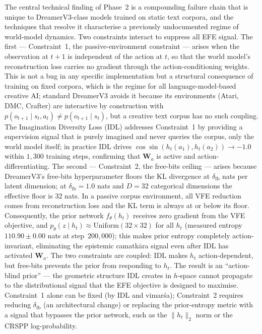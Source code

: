\documentclass[journal,onecolumn,11pt]{IEEEtran}
\begin{document}
The central technical finding of Phase~2 is a compounding failure chain that
is unique to DreamerV3-class models trained on static text corpora, and the
techniques that resolve it characterise a previously undocumented regime of
world-model dynamics.
Two constraints interact to suppress all EFE signal.
The first --- Constraint~1, the passive-environment constraint --- arises
when the observation at $t+1$ is independent of the action at $t$, so that
the world model's reconstruction loss carries no gradient through the
action-conditioning weights.
This is not a bug in any specific implementation but a structural
consequence of training on fixed corpora, which is the regime for all
language-model-based creative AI; standard DreamerV3 avoids it because its
environments (Atari, DMC, Crafter) are interactive by construction with
$p(o_{t+1} \mid s_t, a_t) \neq p(o_{t+1} \mid s_t)$, but a creative text
corpus has no such coupling.
The Imagination Diversity Loss (IDL) addresses Constraint~1 by providing a
supervision signal that is purely imagined and never queries the corpus,
only the world model itself; in practice IDL drives
$\cos\!\sin(h_t(a_1), h_t(a_2)) \to -1.0$ within $1{,}300$ training steps,
confirming that $\mathbf{W}_a$ is active and action-differentiating.
The second --- Constraint~2, the free-bits ceiling --- arises because
DreamerV3's free-bits hyperparameter floors the KL divergence at
$\delta_{\text{fb}}$ nats per latent dimension; at $\delta_{\text{fb}} = 1.0$
nats and $D = 32$ categorical dimensions the effective floor is $32$ nats.
In a passive corpus environment, all VFE reduction comes from reconstruction
loss and the KL term is always at or below its floor.
Consequently, the prior network $f_\theta(h_t)$ receives zero gradient from
the VFE objective, and
$p_\theta(z \mid h_t) \approx \text{Uniform}(32{\times}32)$ for all $h_t$
(measured entropy $110.90 \pm 0.00$ nats at step~$200{,}000$); this makes
prior entropy completely action-invariant, eliminating the epistemic
camatkāra signal even after IDL has activated $\mathbf{W}_a$.
The two constraints are coupled: IDL makes $h_t$ action-dependent, but
free-bits prevents the prior from responding to $h_t$.
The result is an ``action-blind prior'' --- the geometric structure IDL
creates in $h$-space cannot propagate to the distributional signal that the
EFE objective is designed to maximise.
Constraint~1 alone can be fixed (by IDL and vimarśa); Constraint~2 requires
reducing $\delta_{\text{fb}}$ (an architectural change) or replacing the
prior-entropy metric with a signal that bypasses the prior network, such as
the $\|h_t\|_2$ norm or the CRSPP log-probability.
\end{document}

